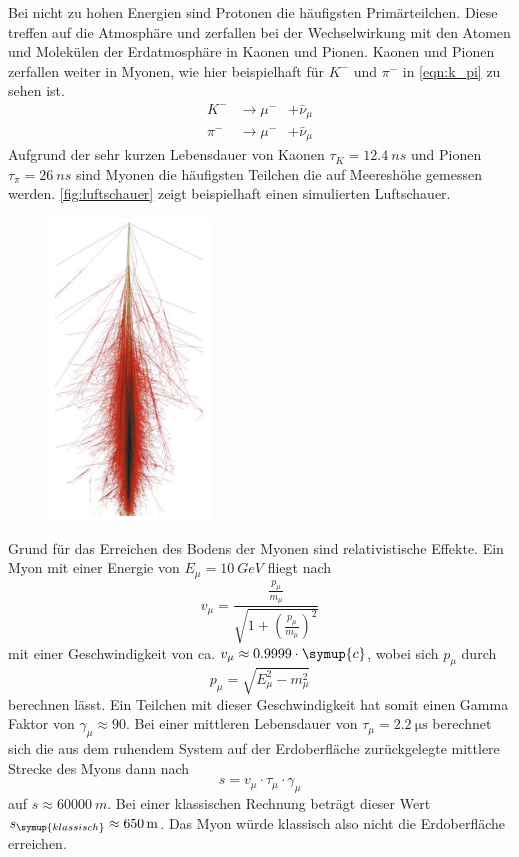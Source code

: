 Bei nicht zu hohen Energien sind Protonen die häufigsten Primärteilchen. Diese treffen auf die Atmosphäre und zerfallen bei der Wechselwirkung mit den Atomen und Molekülen der Erdatmosphäre in Kaonen und Pionen. Kaonen und Pionen zerfallen weiter in Myonen, wie hier beispielhaft für $K^-$ und $\pi^-$ in \autoref{eqn:k_pi} zu sehen ist.
\begin{equation}
    \begin{aligned}
    \label{eqn:k_pi}
        K^- &\rightarrow \mu^- &+ \bar{\nu}_\mu \\
        \pi^- &\rightarrow \mu^- &+ \bar{\nu}_\mu
    \end{aligned}
\end{equation}
Aufgrund der sehr kurzen Lebensdauer von Kaonen $\tau_K = \SI{12.4}{ns}$ und Pionen $\tau_{\pi} = \SI{26}{ns}$ \cite{astro} sind Myonen die häufigsten Teilchen die auf Meereshöhe gemessen werden. \autoref{fig:luftschauer} zeigt beispielhaft einen simulierten Luftschauer. 
\begin{figure}[H]
 \centering
 \includegraphics[width=0.2\linewidth]{data/Luftschauer.png}
 \label{fig:luftschauer}
\end{figure}
\noindent
Grund für das Erreichen des Bodens der Myonen sind relativistische Effekte. Ein Myon mit einer Energie von $E_{\mu} = \SI{10}{GeV}$ fliegt nach 
\begin{equation}
    \label{eqn:t1}
    v_\mu = \frac{\frac{p_\mu}{m_\mu}}{\sqrt{1 + \left( \frac{p_\mu}{m_\mu} \right)^{2}}}
\end{equation}
mit einer Geschwindigkeit von ca. $v_{\mu} \approx 0.9999 \cdot \symup{c}$, wobei sich $p_\mu$ durch 
\begin{equation}
    p_\mu = \sqrt{E_\mu^2 - m_\mu^2}
\end{equation}
berechnen lässt.
Ein Teilchen mit dieser Geschwindigkeit hat somit einen Gamma Faktor von $\gamma_\mu \approx 90$. Bei einer mittleren Lebensdauer von $\tau_{\mu} = \SI{2.2}{\micro\second}$ \cite{pdg} berechnet sich die aus dem ruhendem System auf der Erdoberfläche zurückgelegte mittlere Strecke des Myons dann nach 
\begin{equation}
    \label{eqn:t2}
    s = v_{\mu} \cdot \tau_{\mu} \cdot \gamma_{\mu}
\end{equation}
auf $s \approx \SI{60000}{m}$. Bei einer klassischen Rechnung beträgt dieser Wert $s_{\symup{klassisch}} \approx \SI{650}{m}$. Das Myon würde klassisch also nicht die Erdoberfläche erreichen.
